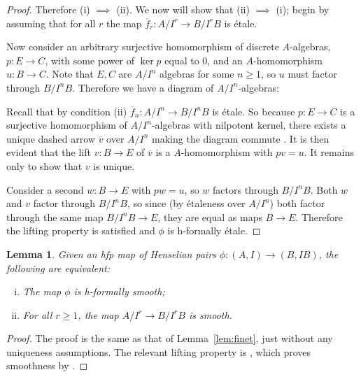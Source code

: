 \documentclass[12pt]{article}
\newcommand{\ol}[1]{\overline{#1}}
\newcommand{\Et}{\'etale\xspace}
\newcommand{\hfp}{hfp\xspace}
\newcommand{\hfetale}{h-formally \'etale\xspace}
\newcommand{\hfsmooth}{h-formally smooth\xspace}
\newtheorem{lemma}[theorem]{Lemma}
\theoremstyle{definition}
\numberwithin{equation}{subsection}
\begin{document}
\begin{proof}
Therefore (i) $\implies$ (ii). We now will show that (ii) $\implies$ (i); begin by assuming that for all $r$ the map $\ol{f}_r: A/I^r \to B/I^rB$ is \Et.


Now consider an arbitrary surjective homomorphism of discrete $A$-algebras, $p: E \to C$, with some power of $\ker p$ equal to $0$, and an $A$-homomorphism $u: B \to C$. Note that $E,C$ are  $A/I^n$ algebras for some $n \ge 1$, so $u$ must factor through $B/I^nB$. Therefore we have a diagram of $A/I^n$-algebras:

\begin{center}
\end{center} \vspace{-.25in}



Recall that by condition (ii) $\ol{f}_n: A/I^n \to B/I^nB$ is \Et. So because $p: E \to C$ is a surjective homomorphism of $A/I^n$-algebras with nilpotent kernel, there exists a unique dashed arrow $\ol{v}$ over $A/I^n$ making the diagram commute \cite[Theorem 17.6.1]{ega44}. It is then evident that the lift $v: B \to E$ of $\ol{v}$ is a $A$-homomorphism with $pv=u$. It remains only to show that $v$ is unique. 

Consider a second $w: B \to E$ with $pw=u$, so $w$ factors through $B/I^nB$. Both $w$ and $v$ factor through $B/I^n B$, so since (by {\Et}ness over $A/I^n$) both factor through the same map $B/I^nB \to E$, they are equal as maps $B \to E$. Therefore the lifting property is satisfied and $\phi$ is \hfetale.\end{proof}


\begin{lemma}\label{lem:finsm} Given an \hfp map of Henselian pairs $\phi:(A,I) \to (B,IB)$, the following are equivalent:

\begin{enumerate}[(i)]
\item The map $\phi$ is \hfsmooth;
\item For all $r \ge 1$, the map $A/I^r \to B/I^rB$ is smooth.
\end{enumerate}

\end{lemma}
\begin{proof}
The proof is the same as that of Lemma~\ref{lem:finet}, just without any uniqueness assumptions. The relevant lifting property is \cite[Definition 19.3.1]{ega41}, which proves smoothness by \cite[Theorem 17.5.1]{ega44}.\end{proof}
\end{document}

